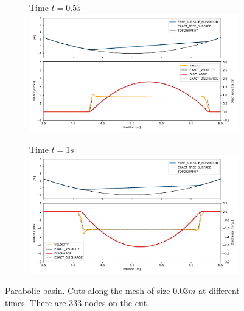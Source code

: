 \documentclass[a4paper,12pt]{elsarticle}
\begin{document}
\begin{figure}[H]
\begin{subfigure}{\textwidth}
    \centering
    Time $t=0.5s$
    \includegraphics[width=\textwidth]{img/par/parabola_t0.5.pdf}
\end{subfigure}
\par\medskip
\begin{subfigure}{\textwidth}
    \centering
    Time $t=1s$
    \includegraphics[width=\textwidth]{img/par/parabola_t1.0.pdf}
\end{subfigure}
\caption{Parabolic basin. Cuts along the mesh of size $0.03m$ at different times. There are 333 nodes on the cut.}
\label{parabola_graphic}
\end{figure}
\end{document}
